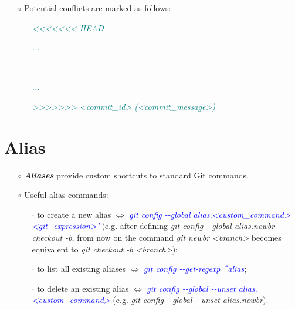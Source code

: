 \documentclass[a4paper,portrait,10pt]{article}   %
\newcommand{\mybulletlvA}{$\circ$}   %
\newcommand{\mybulletlvB}{$\cdot$}   %
\newcommand{\mydiv}{$\Leftrightarrow$ }   %
\newcommand{\mysapo}[1]{\textquotesingle #1\textquotesingle }   %
\newcommand{\mycmd}[1]{\textcolor{blue}{\textit{#1}}}   %
\newcommand{\myvspace}{\vspace{4mm}}   %
\newcommand{\mytextfilecolor}{teal}   %
\begin{document}
\begin{itemize}
\item[\mybulletlvA] Potential conflicts are marked as follows:
\begin{itemize}
  \item[] \textcolor{\mytextfilecolor}{\textit{<{}<{}<{}<{}<{}<{}< HEAD}}
  \item[] \textcolor{\mytextfilecolor}{\textit{...}}
  \item[] \textcolor{\mytextfilecolor}{\textit{=======}}
  \item[] \textcolor{\mytextfilecolor}{\textit{...}}
  \item[] \textcolor{\mytextfilecolor}{\textit{>{}>{}>{}>{}>{}>{}> <commit\_id> (<commit\_message>)}}
\end{itemize}
\end{itemize}
\myvspace


\section{Alias}   \label{sec:Alias}

\begin{itemize}
\item[\mybulletlvA] \textbf{\textit{Aliases}} provide custom shortcuts to standard Git commands.
\myvspace

\item[\mybulletlvA] Useful alias commands:
\begin{itemize}
  \item[\mybulletlvB] to create a new alias \mydiv \mycmd{git config -{}-global alias.<custom\_command> \mysapo{<git\_expression>}'} (e.g. after defining \textit{git config -{}-global alias.newbr \mysapo{checkout -b}}, from now on the command \textit{git newbr <branch>} becomes equivalent to \textit{git checkout -b <branch>});
  \item[\mybulletlvB] to list all existing aliases \mydiv \mycmd{git config -{}-get-regexp \textasciicircum alias};
  \item[\mybulletlvB] to delete an existing alias \mydiv \mycmd{git config -{}-global -{}-unset alias.<custom\_command>} (e.g. \textit{git config -{}-global -{}-unset alias.newbr}).
\end{itemize}
\end{itemize}
\myvspace

\end{document}
